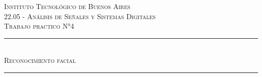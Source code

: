 \begin{titlepage}
    
    \newcommand{\HRule}{\rule{\linewidth}{0.5mm}} %
        
    \center %
         
        
    \textsc{\LARGE Instituto Tecnológico de Buenos Aires}\\[2cm] %
    \textsc{\Large 22.05 - Análisis de Señales y Sistemas Digitales}\\[1.5cm] %
    \textsc{\large Trabajo practico N°4}\\[0.5cm] %
        
        
        
    \HRule \\[0.5cm]
    \textsc{ \huge  Reconocimiento facial}\\[0.4cm] %
    \HRule \\[2cm]
         
        

\end{titlepage}
